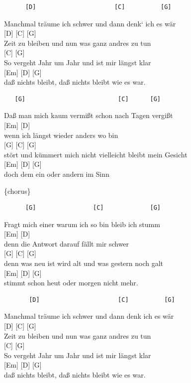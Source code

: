 \documentclass[
  letterpaper,
]{scrbook}
\begin{document}
\begin{verbatim}
      [D]                      [C]          [G]
\end{verbatim}

Manchmal träume ich schwer und dann denk` ich es wär\\
{[}D{]} {[}C{]} {[}G{]}\\
Zeit zu bleiben und nun was ganz andres zu tun\\
{[}C{]} {[}G{]}\\
So vergeht Jahr um Jahr und ist mir längst klar\\
{[}Em{]} {[}D{]} {[}G{]}\\
daß nichts bleibt, daß nichts bleibt wie es war.

\begin{verbatim}
   [G]                          [C]      [G]
\end{verbatim}

Daß man mich kaum vermißt schon nach Tagen vergißt\\
{[}Em{]} {[}D{]}\\
wenn ich längst wieder anders wo bin\\
{[}G{]} {[}C{]} {[}G{]}\\
stört und kümmert mich nicht vielleicht bleibt mein Gesicht\\
{[}Em{]} {[}D{]} {[}G{]}\\
doch dem ein oder andern im Sinn

\{chorus\}

\begin{verbatim}
      [G]                [C]             [G]
\end{verbatim}

Fragt mich einer warum ich so bin bleib ich stumm\\
{[}Em{]} {[}D{]}\\
denn die Antwort darauf fällt mir schwer\\
{[}G{]} {[}C{]} {[}G{]}\\
denn was neu ist wird alt und was gestern noch galt\\
{[}Em{]} {[}D{]} {[}G{]}\\
stimmt schon heut oder morgen nicht mehr.

\begin{verbatim}
       [D]                      [C]          [G]
\end{verbatim}

Manchmal träume ich schwer und dann denk ich es wär\\
{[}D{]} {[}C{]} {[}G{]}\\
Zeit zu bleiben und nun was ganz andres zu tun\\
{[}C{]} {[}G{]}\\
So vergeht Jahr um Jahr und ist mir längst klar\\
{[}Em{]} {[}D{]} {[}G{]}\\
daß nichts bleibt, daß nichts bleibt wie es war.
\end{document}
